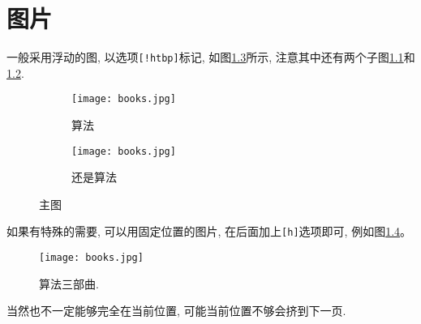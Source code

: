 \chapter{图片}

  一般采用浮动的图, 以选项\texttt{[!htbp]}标记, 如图\ref{fig:algorithm}所示,
注意其中还有两个子图\ref{fig:algorithm:a}和\ref{fig:algorithm:b}.

\begin{figure}[!htbp]
\centering
\begin{subfigure}[t]{.3\textwidth}
  \centering
  \texttt{[image: books.jpg]}
  \caption{算法}
  \label{fig:algorithm:a}
\end{subfigure}
\quad
\begin{subfigure}[t]{.3\textwidth}
  \centering
  \texttt{[image: books.jpg]}
  \caption{还是算法}
  \label{fig:algorithm:b}
\end{subfigure}
\caption{主图}
\label{fig:algorithm}
\end{figure}


  如果有特殊的需要, 可以用固定位置的图片, 在后面加上\texttt{[h]}选项即可, 例如图\ref{fig:books}。

\begin{figure}[h]
    \centering
    \texttt{[image: books.jpg]}
    \caption{算法三部曲.}
    \label{fig:books}
\end{figure}

  当然也不一定能够完全在当前位置, 可能当前位置不够会挤到下一页.
